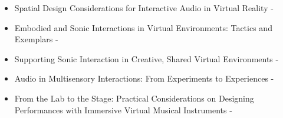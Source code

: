 \begin{itemize}
    \item Spatial Design Considerations for Interactive Audio in Virtual Reality - \citep{deacon2023}
    \item Embodied and Sonic Interactions in Virtual Environments: Tactics and Exemplars - \citep{olsen2023}
    \item Supporting Sonic Interaction in Creative, Shared Virtual Environments - \citep{men2023}
    \item Audio in Multisensory Interactions: From Experiments to Experiences - \citep{serafin2023}
    \item From the Lab to the Stage: Practical Considerations on Designing Performances with Immersive Virtual Musical Instruments - \citep{zappi2023}
\end{itemize}

